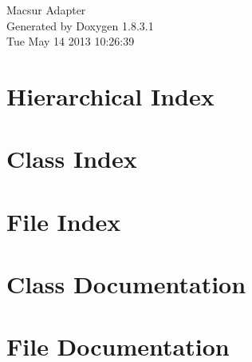 \documentclass{book}
\begin{document}
\hypersetup{pageanchor=false,citecolor=blue}
\begin{titlepage}
\vspace*{7cm}
\begin{center}
{\Large Macsur Adapter }\\
\vspace*{1cm}
{\large Generated by Doxygen 1.8.3.1}\\
\vspace*{0.5cm}
{\small Tue May 14 2013 10:26:39}\\
\end{center}
\end{titlepage}
\clearemptydoublepage
{}
\tableofcontents
\clearemptydoublepage
{}
\hypersetup{pageanchor=true,citecolor=blue}
\chapter{Hierarchical Index}

\chapter{Class Index}

\chapter{File Index}

\chapter{Class Documentation}









\chapter{File Documentation}

















\printindex
\end{document}
